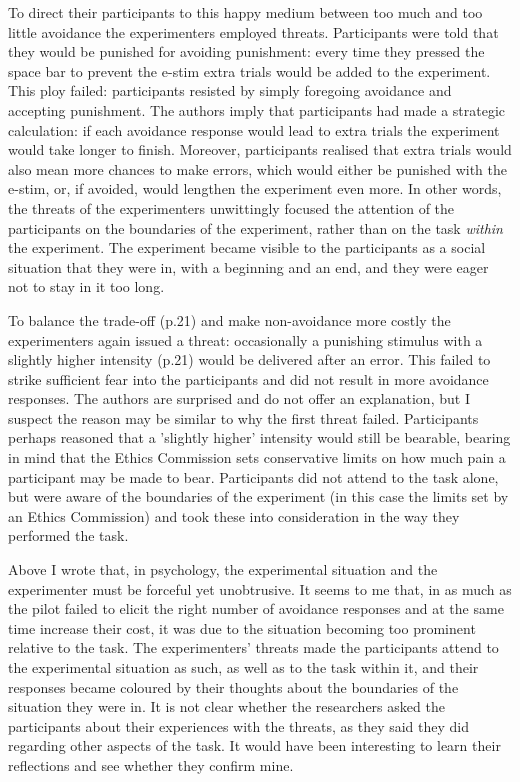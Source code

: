 \documentclass[twocolumn, serif, authordate, review]{jote-article}
\begin{document}
To direct their participants to this happy medium between too much and too little avoidance the experimenters employed threats. Participants were told that they would be punished for avoiding punishment: every time they pressed the space bar to prevent the e-stim extra trials would be added to the experiment. This ploy failed: participants resisted by simply foregoing avoidance and accepting punishment. The authors imply that participants had made a strategic calculation: if each avoidance response would lead to extra trials the experiment would take longer to finish. Moreover, participants realised that extra trials would also mean more chances to make errors, which would either be punished with the e-stim, or, if avoided, would lengthen the experiment even more. In other words, the threats of the experimenters unwittingly focused the attention of the participants on the boundaries of the experiment, rather than on the task \textit{within} the experiment. The experiment became visible to the participants as a social situation that they were in, with a beginning and an end, and they were eager not to stay in it too long.

To {\textquotedbl}balance the trade-off{\textquotedbl} (p.21) and make non-avoidance more costly the experimenters again issued a threat: occasionally a punishing stimulus with {\textquotedbl}a slightly higher intensity{\textquotedbl} (p.21) would be delivered after an error. This failed to strike sufficient fear into the participants and did not result in more avoidance responses. The authors are surprised and do not offer an explanation, but I suspect the reason may be similar to why the first threat failed. Participants perhaps reasoned that a 'slightly higher' intensity would still be bearable, bearing in mind that the Ethics Commission sets conservative limits on how much pain a participant may be made to bear. Participants did not attend to the task alone, but were aware of the boundaries of the experiment (in this case the limits set by an Ethics Commission) and took these into consideration in the way they performed the task.

Above I wrote that, in psychology, the experimental situation and the experimenter must be forceful yet unobtrusive. It seems to me that, in as much as the pilot failed to elicit the right number of avoidance responses and at the same time increase their cost, it was due to the situation becoming too prominent relative to the task. The experimenters' threats made the participants attend to the experimental situation as such, as well as to the task within it, and their responses became coloured by their thoughts about the boundaries of the situation they were in. It is not clear whether the researchers asked the participants about their experiences with the threats, as they said they did regarding other aspects of the task. It would have been interesting to learn their reflections and see whether they confirm mine.
\end{document}
